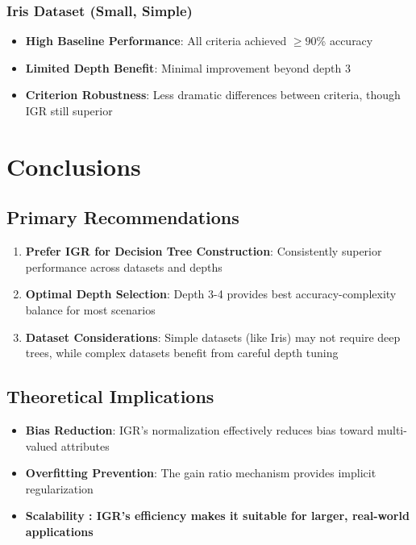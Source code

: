 \documentclass{article}
\begin{document}
\subsubsection{Iris Dataset (Small, Simple)}
\begin{itemize}
    \item \textbf{High Baseline Performance}: All criteria achieved $\geq90$\% accuracy
    \item \textbf{Limited Depth Benefit}: Minimal improvement beyond depth 3
    \item \textbf{Criterion Robustness}: Less dramatic differences between criteria, though IGR still superior
\end{itemize}

\section{Conclusions}

\subsection{Primary Recommendations}
\begin{enumerate}
    \item \textbf{Prefer IGR for Decision Tree Construction}: Consistently superior performance across datasets and depths
    \item \textbf{Optimal Depth Selection}: Depth 3-4 provides best accuracy-complexity balance for most scenarios
    \item \textbf{Dataset Considerations}: Simple datasets (like Iris) may not require deep trees, while complex datasets benefit from careful depth tuning
\end{enumerate}

\subsection{Theoretical Implications}
\begin{itemize}
    \item \textbf{Bias Reduction}: IGR's normalization effectively reduces bias toward multi-valued attributes
    \item \textbf{Overfitting Prevention}: The gain ratio mechanism provides implicit regularization
    \item \textbf{Scalability : IGR's efficiency makes it suitable for larger, real-world applications}
\end{itemize}
\end{document}
